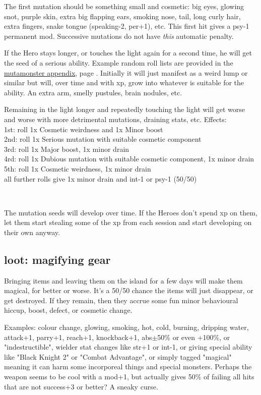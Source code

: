\noindent The first mutation should be something small and cosmetic: big eyes, glowing snot, purple skin, extra big flapping ears, smoking nose, tail, long curly hair, extra fingers, snake tongue (speaking-2, per+1), etc. This first hit gives a psy-1 permanent mod. Successive mutations do not have \emph{this} automatic penalty.

If the Hero stays longer, or touches the light again for a second time, he will get the seed of a serious ability. Example random roll lists are provided in the \hyperref[appendixmagicisland]{mutamonster appendix}, page \pageref{appendixmagicisland}. Initially it will just manifest as a weird lump or similar but will, over time and with xp, grow into whatever is suitable for the ability. An extra arm, smelly pustules, brain nodules, etc.

Remaining in the light longer and repeatedly touching the light will get worse and worse with more detrimental mutations, draining stats, etc. Effects:\\
1st: roll 1x Cosmetic weirdness and 1x Minor boost\\
2nd: roll 1x Serious mutation with suitable cosmetic component\\
3rd: roll 1x Major boost, 1x minor drain\\
4rd: roll 1x Dubious mutation with suitable cosmetic component, 1x minor drain\\
5th: roll 1x Cosmetic weirdness, 1x minor drain\\
all further rolls give 1x minor drain and int-1 or psy-1 (50/50)

\

The mutation seeds will develop over time. If the Heroes don't spend xp on them, let them start stealing some of the xp from each session and start developing on their own anyway.


\subsection*{loot: magifying gear}
Bringing items and leaving them on the island for a few days will make them magical, for better or worse. It's a 50/50 chance the items will just disappear, or get destroyed. If they remain, then they accrue some fun minor behavioural hiccup, boost, defect, or cosmetic change.

Examples: colour change, glowing, smoking, hot, cold, burning, dripping water, attack+1, parry+1, reach+1, knockback+1, abs$\pm$50\% or even +100\%, or "indestructible", wielder stat changes like str+1 or int-1, or giving special ability like "Black Knight 2" or "Combat Advantage", or simply tagged "magical" meaning it can harm some incorporeal things and special monsters.
Perhaps the weapon seems to be cool with a mod+1, but actually gives 50\% of failing all hits that are not success+3 or better? A sneaky curse.










